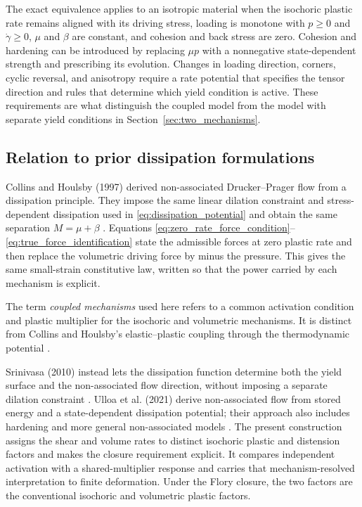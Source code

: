 \documentclass[11pt]{article}
\begin{document}
The exact equivalence applies to an isotropic material when the isochoric
plastic rate remains aligned with its driving stress, loading is monotone with
\(p\ge0\) and \(\dot\gamma\ge0\), \(\mu\) and \(\beta\) are constant, and
cohesion and back stress are zero.  Cohesion and hardening can be introduced by
replacing \(\mu p\) with a nonnegative state-dependent strength and prescribing
its evolution.  Changes in loading direction, corners, cyclic reversal, and
anisotropy require a rate potential that specifies the tensor direction and
rules that determine which yield condition is active.  These requirements are
what distinguish the coupled model from the model with separate yield
conditions in Section~\ref{sec:two_mechanisms}.



\subsection{Relation to prior dissipation formulations}
\label{sec:prior_dissipation}

Collins and Houlsby (1997) derived non-associated Drucker--Prager flow from
a dissipation principle. They impose the same linear dilation
constraint and stress-dependent dissipation used in
\eqref{eq:dissipation_potential} and obtain the same separation
\(M=\mu+\beta\) \cite[Sec.~5]{collins1997}.  Equations
\eqref{eq:zero_rate_force_condition}--\eqref{eq:true_force_identification}
state the admissible forces at zero plastic rate and then replace the
volumetric driving force by minus the pressure. This gives the same
small-strain constitutive law, written so that the power carried by each
mechanism is explicit.

The term \emph{coupled mechanisms} used here refers to a common activation
condition and plastic multiplier for the isochoric and volumetric mechanisms.
It is distinct from Collins and Houlsby's elastic--plastic coupling through the
thermodynamic potential \cite[Sec.~3]{collins1997}.

Srinivasa (2010) instead lets the dissipation function determine both the yield
surface and the non-associated flow direction, without imposing a separate
dilation constraint \cite{srinivasa2010}.  Ulloa et al. (2021) derive
non-associated flow from stored energy and a state-dependent dissipation
potential; their approach also includes hardening and more general
non-associated models \cite{ulloa2021}.  The present construction assigns the
shear and volume rates to distinct isochoric plastic and distension factors and
makes the closure requirement explicit. It compares independent activation
with a shared-multiplier response and carries that mechanism-resolved
interpretation to finite deformation.  Under the Flory closure, the two factors
are the conventional isochoric and volumetric plastic factors.
\end{document}
